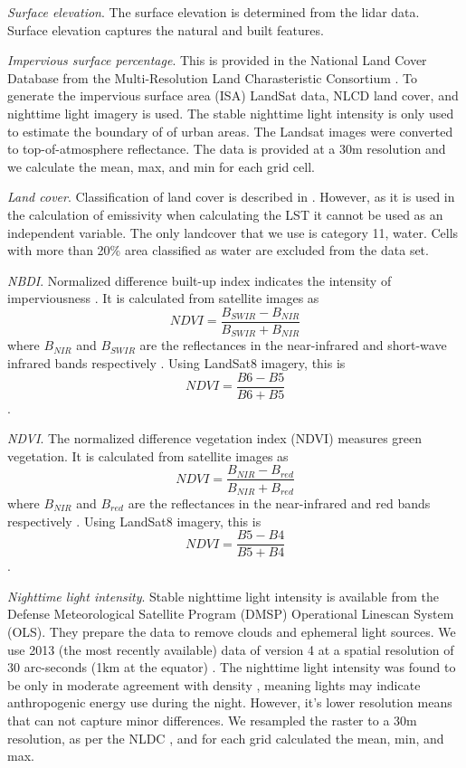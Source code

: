 \documentclass[]{elsarticle}
\begin{document}
\textit{Surface elevation}. The surface elevation is determined from the lidar data. Surface elevation captures the natural and built features. 

\textit{Impervious surface percentage}. This is provided in the National Land Cover Database from the Multi-Resolution Land Charasteristic Consortium \cite{Xian2011-aa}. To generate the impervious surface area (ISA) LandSat data, NLCD land cover, and nighttime light imagery is used. The stable nighttime light intensity is only used to estimate the boundary of of urban areas. The Landsat images were converted to top-of-atmosphere reflectance. The data is provided at a 30m resolution and we calculate the mean, max, and min for each grid cell.

\textit{Land cover}. Classification of land cover is described in \cite{Homer2015-ce}. However, as it is used in the calculation of emissivity when calculating the LST it cannot be used as an independent variable. The only landcover that we use is category 11, water. Cells with more than 20\% area classified as water are excluded from the data set.

\textit{NBDI}. Normalized difference built-up index indicates the intensity of imperviousness \cite{Bhatti2014-ae}. It is calculated from satellite images as $$NDVI=\frac{B_{SWIR}-B_{NIR}}{B_{SWIR}+B_{NIR}}$$ where $B_{NIR}$ and $B_{SWIR}$ are the reflectances in the near-infrared and short-wave infrared bands respectively \cite{Alhawiti2016-wv}. Using LandSat8 imagery, this is $$NDVI=\frac{B6-B5}{B6+B5}$$ \cite{barsi2014}.

\textit{NDVI}. The normalized difference vegetation index (NDVI) measures green vegetation. It is calculated from satellite images as $$NDVI=\frac{B_{NIR}-B_{red}}{B_{NIR}+B_{red}}$$ where $B_{NIR}$ and $B_{red}$ are the reflectances in the near-infrared and red bands respectively \cite{Alhawiti2016-wv}. Using LandSat8 imagery, this is $$NDVI=\frac{B5-B4}{B5+B4}$$ \cite{barsi2014}.

\textit{Nighttime light intensity}. Stable nighttime light intensity is available from the Defense Meteorological Satellite Program (DMSP) Operational Linescan System (OLS). They prepare the data to remove clouds and ephemeral light sources. We use 2013 (the most recently available) data of version 4 at a spatial resolution of 30 arc-seconds (1km at the equator) \cite{ngdc2013version}. The nighttime light intensity was found to be only in moderate agreement with density \cite{bagan2018}, meaning lights may indicate anthropogenic energy use during the night. However, it's lower resolution means that can not capture minor differences. We resampled the raster to a 30m resolution, as per the NLDC \cite{Homer2015-ce}, and for each grid calculated the mean, min, and max.
\end{document}
